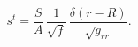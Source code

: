 \begin{equation}
s^t=\frac{S}{A}\,\frac{1}{\sqrt{f}}\,\frac{\delta(r-R)}{\sqrt{g_{rr}}}.
\end{equation}

